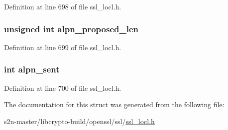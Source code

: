 Definition at line 698 of file ssl\+\_\+locl.\+h.

\subsubsection[{\texorpdfstring{alpn\+\_\+proposed\+\_\+len}{alpn_proposed_len}}]{\setlength{\rightskip}{0pt plus 5cm}unsigned int alpn\+\_\+proposed\+\_\+len}\hypertarget{structcert__st_a31aa97a4cd757c8a744e297971e3f3c8}{}\label{structcert__st_a31aa97a4cd757c8a744e297971e3f3c8}


Definition at line 699 of file ssl\+\_\+locl.\+h.

\subsubsection[{\texorpdfstring{alpn\+\_\+sent}{alpn_sent}}]{\setlength{\rightskip}{0pt plus 5cm}int alpn\+\_\+sent}\hypertarget{structcert__st_a55424bb80f801e12e214fc3050be50c5}{}\label{structcert__st_a55424bb80f801e12e214fc3050be50c5}


Definition at line 700 of file ssl\+\_\+locl.\+h.



The documentation for this struct was generated from the following file\+:\begin{DoxyCompactItemize}
\item 
s2n-\/master/libcrypto-\/build/openssl/ssl/\hyperlink{ssl__locl_8h}{ssl\+\_\+locl.\+h}\end{DoxyCompactItemize}
